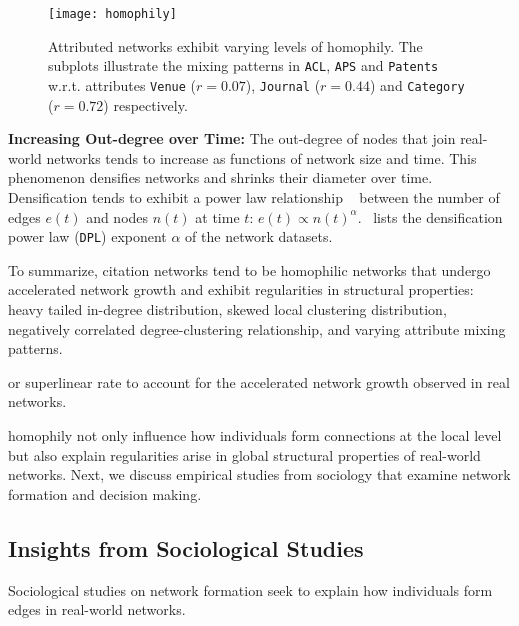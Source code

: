 
\begin{figure}
 \centering
 \texttt{[image: homophily]}
 \caption{
    Attributed networks exhibit varying levels of homophily. The subplots
    illustrate the mixing patterns in \texttt{ACL}, \texttt{APS} and \texttt{Patents}
    w.r.t. attributes \texttt{Venue} ($r=0.07$), \texttt{Journal} ($r=0.44$) and
    \texttt{Category} ($r=0.72$) respectively.
 }
 \label{fig:mixing}
 \vspace{-15pt}
\end{figure}

\textbf{Increasing Out-degree over Time:}
The out-degree of nodes that join real-world networks tends to increase as
functions of network size and time. This phenomenon densifies networks and
shrinks their diameter over time. Densification tends to exhibit a power law
relationship ~\cite{leskovec2005graphs} between the number of edges $e(t)$ and
nodes $n(t)$ at time $t$: $e(t) \propto n(t)^{\alpha}$.~
lists the densification power law (\texttt{DPL}) exponent $\alpha$ of the
network datasets.

To summarize, citation networks tend to be homophilic networks that undergo
accelerated network growth and exhibit regularities in structural properties:
heavy tailed in-degree distribution, skewed local clustering distribution,
negatively correlated degree-clustering relationship, and varying attribute
mixing patterns.

or superlinear rate to account for the accelerated network growth observed in
real networks.

homophily not only influence how individuals form connections at the local level
but also explain regularities arise in global structural properties of
real-world networks. Next, we discuss empirical studies from sociology that
examine network formation and decision making.

\subsection{Insights from Sociological Studies}

Sociological studies on network formation seek to explain
how individuals form edges in real-world networks.

